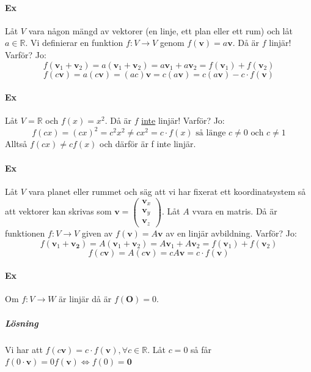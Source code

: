 \paragraph{Ex} Låt $V$ vara någon mängd av vektorer (en linje, ett plan eller ett rum) och låt $a\in\mathbb{R}$. 
Vi definierar en funktion $f:V\rightarrow V$ genom $f(\bm{v})=a\bm{v}$.
Då är $f$ linjär! Varför?
Jo:
\begin{equation*}
    f(\bm{v}_{1}+\bm{v}_{2})=a(\bm{v}_{1}+\bm{v}_{2})=a\bm{v}_{1}+a\bm{v}_{2}=f(\bm{v}_{1})+f(\bm{v}_{2})
\end{equation*}
\begin{equation*}
    f(c\bm{v})=a(c\bm{v})=(ac)\bm{v}=c(a\bm{v})=c(a\bm{v})-c\cdot f(\bm{v})
\end{equation*}

\paragraph{Ex} Låt $V=\mathbb{R}$ och $f(x)=x^{2}$.
Då är $f$ \underline{inte} linjär!
Varför? Jo:
\begin{equation*}
    f(cx)=(cx)^{2}=c^{2}x^{2}\neq cx^{2}=c\cdot f(x) \text{ så länge $c\neq 0$ och $c\neq 1$}
\end{equation*}
Alltså $f(cx)\neq cf(x)$ och därför är f inte linjär.

\paragraph{Ex} Låt $V$ vara planet eller rummet och säg att vi har fixerat ett koordinatsystem så att vektorer kan skrivas som $\bm{v}=\begin{pmatrix}
    \bm{v}_{x}\\\bm{v}_{y}\\\bm{v}_{z}
\end{pmatrix}$.
Låt $A$ vvara en matris. Då är funktionen $f:V\rightarrow V$ given av $f(\bm{v})=A\bm{v}$ av en linjär avbildning.
Varför? Jo:
\begin{equation*}
    f(\bm{v}_{1}+\bm{v_{2}})=A(\bm{v}_{1}+\bm{v}_{2})=A\bm{v}_{1}+A\bm{v}_{2}=f(\bm{v}_{1})+f(\bm{v}_{2})
\end{equation*}
\begin{equation*}
    f(c\bm{v})=A(c\bm{v})=cA\bm{v}=c\cdot f(\bm{v})
\end{equation*}

\paragraph{Ex} Om $f:V\rightarrow W$ är linjär då är $f(\bm{O})=0$.
\subparagraph{Lösning} Vi har att $f(c\bm{v})=c\cdot f(\bm{v}), \forall c\in \mathbb{R}$.
Låt $c=0$ så får $f(0\cdot \bm{v})=0f(\bm{v})\Leftrightarrow f(0)=\bm{0}$
